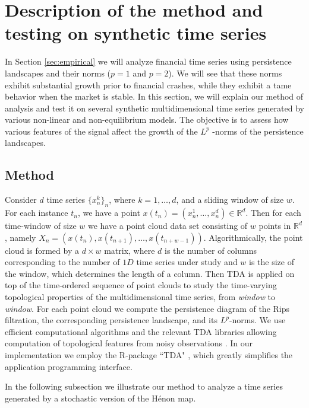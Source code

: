 \documentclass[preprint,12pt]{elsarticle}
\theoremstyle{definition}
\theoremstyle{remark}
\numberwithin{equation}{section}
\theoremstyle{definition}
\begin{document}
\section{Description of the  method and testing on synthetic time series}\label{sec:turbulence}
In Section \ref{sec:empirical} we will analyze financial time series using persistence landscapes and
their   norms ($p = 1$ and $p = 2$). We will see that these norms exhibit substantial growth prior to financial crashes, while they exhibit a tame behavior when the market is stable.
In this section, we will explain our method of analysis and test it on several synthetic multidimensional time series generated by various non-linear and non-equilibrium models. The objective is to assess how various features of the signal affect the growth of the $L^p$ -norms of the persistence landscapes.

\subsection{Method}
Consider $d$ time series  $\{x^k_n\}_n$, where $k=1,\ldots, d$, and a sliding window of size $w$.  For each instance $t_n$, we have a point $x(t_n)=(x^1_n,\ldots, x^d_n)\in \mathbb{R}^d$. Then for each time-window of size $w$ we have a point cloud data set consisting of $w$ points in $\mathbb{R}^d$, namely  $X_n=(x(t_n), x(t_{n+1}), \ldots, x(t_{n+w-1}))$. Algorithmically, the point cloud is formed by a $d\times w$  matrix, where $d$ is the number of columns corresponding to the number of $1D$ time series under study and $w$ is the size of the window, which determines the length of a column. Then TDA is applied on top of the time-ordered sequence of point clouds to study the time-varying topological properties of the multidimensional time series, from \emph{window} to \emph{window}. For each point cloud we compute the persistence diagram of the Rips filtration, the corresponding persistence landscape, and its  $L^p$-norms. We use efficient computational algorithms and the relevant TDA libraries allowing computation of topological features from noisy observations \cite{Morozov14}. In our implementation we employ the R-package ``TDA" \cite{Fasy16}, which greatly simplifies the application programming interface.


In the following subsection we illustrate our method to analyze a time series generated by a  stochastic version of the  H\'enon map.
\end{document}
